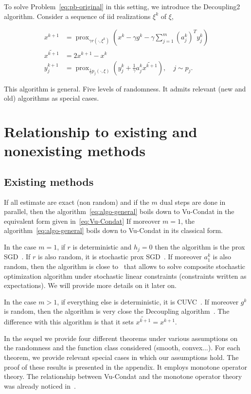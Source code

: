 \documentclass{article}
\DeclareMathOperator{\prox}{prox}
\theoremstyle{definition}
\begin{document}
To solve Problem~\eqref{eq:pb-original} in this setting, we introduce the Decoupling2 algorithm. Consider a sequence of iid realizations $\xi^k$ of $\xi$,


\begin{align}
    \label{eq:algo-general}
    x^{k+1}   &= \prox_{\gamma r(\cdot,\xi^{k})}(x^k - \gamma g^{k} - \gamma \sum_{j=1}^m (a_j^{k})^{T} y_j^k)\\
    \widetilde{x^{k+1}} &= 2x^{k+1} - x^k\\
    y_j^{k+1} &= \prox_{\frac{1}{\gamma} p_j(\cdot,\xi)}(y_j^k + \frac{1}{\gamma} a_j^k \widetilde{x^{k+1}}), \quad j \sim p_j.
\end{align}

This algorithm is general. Five levels of randomness. It admits relevant (new and old) algorithms as special cases.

\section{Relationship to existing and nonexisting methods}

\subsection{Existing methods}
If all estimate are exact (non random) and if the $m$ dual steps are done in parallel, then the algorithm~\eqref{eq:algo-general} boils down to Vu-Condat in the equivalent form given in~\eqref{eq:Vu-Condat}
If moreover $m=1$, the algorithm~\eqref{eq:algo-general} boils down to Vu-Condat in its classical form.


In the case $m=1$, if $r$ is deterministic and $h_j = 0$ then the algorithm is the prox SGD~\cite{gorbunov2019unified}. If $r$ is also random, it is stochastic prox SGD~\cite{bia-hac,bia-hac-sal}. If moreover $a_1^k$ is also random, then the algorithm is close to~\cite{salim} that allows to solve composite stochastic optimization algorithm under stochastic linear constraints (constraints written as expectations). We will provide more details on it later on.

In the case $m > 1$, if everything else is deterministic, it is CUVC~\cite{fercoq,yin,pesquet,iutzeler}. If moreover $g^k$ is random, then the algorithm is very close the Decoupling algorithm~\cite{mishchenko2019stochastic}. The difference with this algorithm is that it sets $\widetilde{x^{k+1}} = x^{k+1}$.


In the sequel we provide four different theorems under various assumptions on the randomness and the function class considered (smooth, convex...).
For each theorem, we provide relevant special cases in which our assumptions hold.
The proof of these results is presented in the appendix. It employs monotone operator theory. The relationship between Vu-Condat and the monotone operator theory was already noticed in~\cite{Vu-Condat}.
\end{document}
